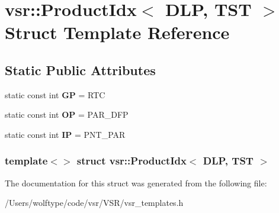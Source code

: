 \hypertarget{structvsr_1_1_product_idx_3_01_d_l_p_00_01_t_s_t_01_4}{\section{vsr\-:\-:Product\-Idx$<$ D\-L\-P, T\-S\-T $>$ Struct Template Reference}
\label{structvsr_1_1_product_idx_3_01_d_l_p_00_01_t_s_t_01_4}
}
\subsection*{Static Public Attributes}
\begin{DoxyCompactItemize}
\item 
\hypertarget{structvsr_1_1_product_idx_3_01_d_l_p_00_01_t_s_t_01_4_a3308e914f6b751e4454949d2f5f2df29}{static const int {\bfseries G\-P} = R\-T\-C}\label{structvsr_1_1_product_idx_3_01_d_l_p_00_01_t_s_t_01_4_a3308e914f6b751e4454949d2f5f2df29}

\item 
\hypertarget{structvsr_1_1_product_idx_3_01_d_l_p_00_01_t_s_t_01_4_a40fdc05c81ff490a300b5997f8ced6a3}{static const int {\bfseries O\-P} = P\-A\-R\-\_\-\-D\-F\-P}\label{structvsr_1_1_product_idx_3_01_d_l_p_00_01_t_s_t_01_4_a40fdc05c81ff490a300b5997f8ced6a3}

\item 
\hypertarget{structvsr_1_1_product_idx_3_01_d_l_p_00_01_t_s_t_01_4_ab261bccd5533f6d5c196cc9026f36b24}{static const int {\bfseries I\-P} = P\-N\-T\-\_\-\-P\-A\-R}\label{structvsr_1_1_product_idx_3_01_d_l_p_00_01_t_s_t_01_4_ab261bccd5533f6d5c196cc9026f36b24}

\end{DoxyCompactItemize}
\subsubsection*{template$<$$>$ struct vsr\-::\-Product\-Idx$<$ D\-L\-P, T\-S\-T $>$}



The documentation for this struct was generated from the following file\-:\begin{DoxyCompactItemize}
\item 
/\-Users/wolftype/code/vsr/\-V\-S\-R/vsr\-\_\-templates.\-h\end{DoxyCompactItemize}
